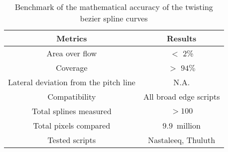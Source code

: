 \begin{table}
\begin{center}
\caption{Benchmark of the mathematical accuracy of the twisting bezier spline curves}
\label{Table:Accuracy}
\begin{tabular}{| c | c |}
  \hline
\textbf{Metrics} & \textbf{Results} \\
  \hline
Area over flow & $<$ 2\% \\
  \hline
Coverage & $>$ $94\%$ \\
  \hline
Lateral deviation from the pitch line & N.A. \\
  \hline
Compatibility & All broad edge scripts \\
  \hline
Total splines measured & $>100$ \\
  \hline
Total pixels compared & $9.9$~million \\
  \hline
Tested scripts & Nastaleeq, Thuluth \\
\hline
\end{tabular}
\end{center}
\end{table}
%
%


